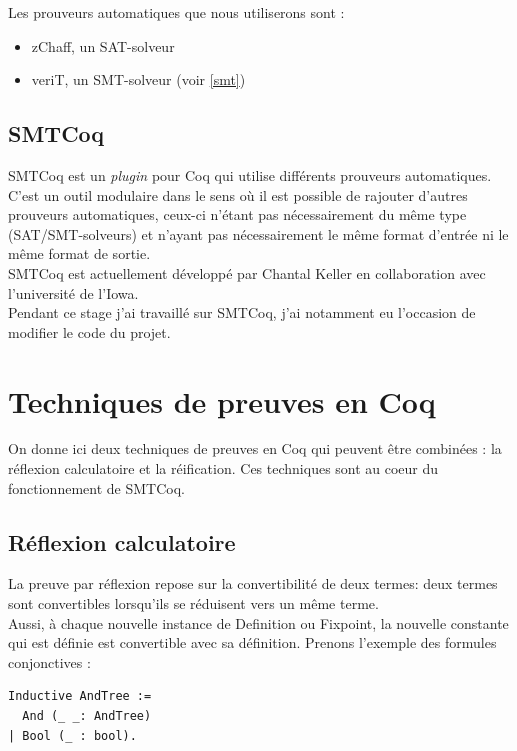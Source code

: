 \documentclass[11pt]{article}
\begin{document}
Les prouveurs automatiques que nous utiliserons sont : 
\begin{itemize}
    \item zChaff, un SAT-solveur
    \item veriT, un SMT-solveur (voir \ref{smt})
\end{itemize}


\subsection{SMTCoq}
 SMTCoq est un \textit{plugin} pour Coq qui utilise différents prouveurs automatiques. C'est un outil modulaire dans le sens où il est possible de rajouter d'autres prouveurs automatiques, ceux-ci n'étant pas nécessairement du même type (SAT/SMT-solveurs) et n'ayant pas nécessairement le même format d'entrée ni le même format de sortie. \\

SMTCoq est actuellement développé par Chantal Keller en collaboration avec l'université de l'Iowa. \\

Pendant ce stage j'ai travaillé sur SMTCoq, j'ai notamment eu l'occasion de modifier le code du projet.

\newpage

\section{Techniques de preuves en Coq} \label{coq}

On donne ici deux techniques de preuves en Coq qui peuvent être combinées : la réflexion calculatoire et la réification. Ces techniques sont au coeur du fonctionnement de SMTCoq.



\subsection{Réflexion calculatoire}

La preuve par réflexion repose sur la convertibilité de deux termes: deux termes sont convertibles lorsqu'ils se réduisent vers un même terme. \\
Aussi, à chaque nouvelle instance de Definition ou Fixpoint, la nouvelle constante qui est définie est convertible avec sa définition. Prenons l'exemple des formules conjonctives : 

\begin{lstlisting}[frame=single]
Inductive AndTree :=
  And (_ _: AndTree)
| Bool (_ : bool).
\end{lstlisting}
\end{document}
